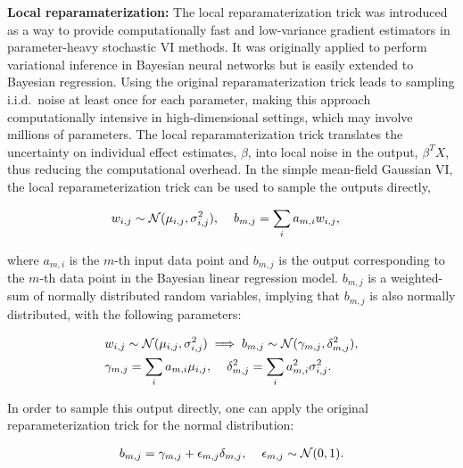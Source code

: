 \vspace{2mm}
\noindent \textbf{Local reparamaterization:} The local reparamaterization trick \cite{kingma2015variational} was introduced as a way to provide computationally fast and low-variance gradient estimators in parameter-heavy stochastic VI methods.
%
It was originally applied to perform variational inference in Bayesian neural networks but is easily extended to Bayesian regression.
%
Using the original reparamaterization trick \cite{kingma2013auto,blundell2015weight} leads to sampling i.i.d.\ noise at least once for each parameter, making this approach computationally intensive in high-dimensional settings, which may involve millions of parameters.
%
The local reparamaterization trick translates the uncertainty on individual effect estimates, $\beta$, into local noise in the output, $\beta^T X$, thus reducing the computational overhead.
%
In the simple mean-field Gaussian VI, the local reparameterization trick can be used to sample the outputs directly,

\begin{align}
   &w_{i,j} \sim \mathcal{N}(\mu_{i,j}, \sigma^2_{i,j}), \hspace{4mm} b_{m,j} =  \sum_{i} a_{m,i} w_{i,j},
\end{align}

where $a_{m,i}$ is the $m$-th input data point and $b_{m,j}$ is the output corresponding to the $m$-th data point in the Bayesian linear regression model.
%
$b_{m,j}$ is a weighted-sum of normally distributed random variables, implying that $b_{m,j}$ is also normally distributed, with the following parameters:

\begin{align}
    &w_{i,j} \sim \mathcal{N}(\mu_{i,j}, \sigma^2_{i,j}) \implies b_{m,j} \sim \mathcal{N}(\gamma_{m,j}, \delta^2_{m,j}), \nonumber \\
    &\gamma_{m,j} = \sum_{i}a_{m,i}\mu_{i,j} ,\hspace{4mm}\delta^2_{m,j} =  \sum_{i}a^2_{m,i}\sigma^2_{i,j}.
\end{align}

In order to sample this output directly, one can apply the original reparameterization trick for the normal distribution:

\begin{align}
   b_{m,j} =  \gamma_{m,j} + \epsilon_{m,j} \delta_{m,j}, \hspace{4mm} \epsilon_{m,j} \sim \mathcal{N}(0, 1).
\label{eq:reparam_local}
\end{align}

